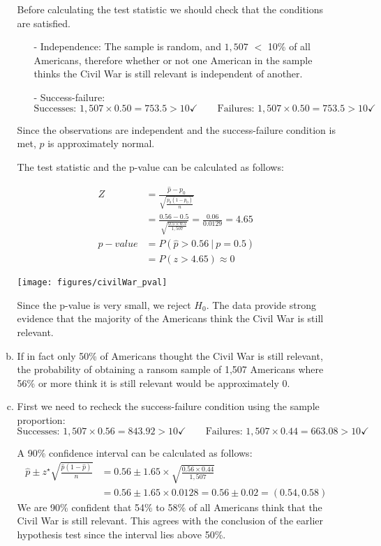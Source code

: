 \documentclass[11pt]{article}
\begin{document}
\begin{enumerate}
\begin{enumerate}[(a)]
Before calculating the test statistic we should check that the conditions are satisfied. 
\begin{itemize}
\item[-] Independence:  The sample is random, and $1,507$ $<$ 10\% of all Americans, therefore whether or not one American in the sample thinks the Civil War is still relevant is independent of another.
\item[-] Success-failure:
\[ \text{Successes: } 1,507 \times  0.50 = 753.5 > 10 \checkmark \qquad \text{Failures: } 1,507 \times  0.50 = 753.5 > 10 \checkmark \]
\end{itemize}
Since the observations are independent and the success-failure condition is met, $\hat{p}$ is approximately normal.

The test statistic and the p-value can be calculated as follows:

\begin{minipage}{0.6\textwidth}
\begin{align*}
Z &= \frac{\hat{p} - p_0}{\sqrt{\frac{p_0 (1 - p_0)}{n}}} \\
&= \frac{0.56 - 0.5}{\sqrt{\frac{0.5 \times  0.5}{1,507}}} = \frac{0.06}{0.0129} = 4.65 \\
p-value &= P(\hat{p} >  0.56~|~p = 0.5) \\
&= P(z > 4.65) \approx 0
\end{align*}
\end{minipage}
\begin{minipage}{0.4\textwidth}
\texttt{[image: figures/civilWar\_pval]}
\end{minipage}

Since the p-value is very small, we reject $H_0$. The data provide strong evidence that the majority of the Americans think the Civil War is still relevant.

\item If in fact only 50\% of Americans thought the Civil War is still relevant, the probability of obtaining a ransom sample of 1,507 Americans where 56\% or more think it is still relevant would be approximately 0.

\item First we need to recheck the success-failure condition using the sample proportion:
\[ \text{Successes: } 1,507 \times  0.56 = 843.92 > 10 \checkmark \qquad \text{Failures: } 1,507 \times  0.44 = 663.08 > 10 \checkmark \]

A 90\% confidence interval can be calculated as follows:
\begin{align*}
\hat{p} \pm z^{\star} \sqrt{\frac{\hat{p} (1 - \hat{p})}{n}} &= 0.56 \pm 1.65 \times  \sqrt{\frac{0.56 \times  0.44}{1,507}} \\
&= 0.56 \pm 1.65 \times  0.0128 = 0.56 \pm 0.02 = (0.54, 0.58)
\end{align*}
We are 90\% confident that 54\% to 58\% of all Americans think that the Civil War is still relevant. This agrees with the conclusion of the earlier hypothesis test since the interval lies above 50\%.
\end{enumerate}


\end{enumerate}
\end{document}
